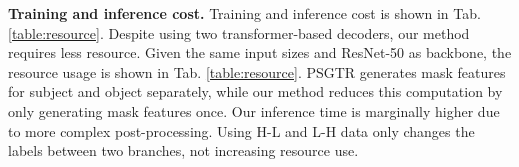 \noindent \textbf{Training and inference cost.}
Training and inference cost is shown in Tab. \ref{table:resource}.
Despite using two transformer-based decoders, our method requires less resource.
Given the same input sizes  and ResNet-50 as backbone, the resource usage is shown in Tab. \ref{table:resource}.
PSGTR \cite{yang2022panoptic} generates mask features for subject and object separately, while our method reduces this computation by only generating mask features once.
Our inference time is marginally higher due to more complex post-processing.
Using H-L and L-H data only changes the labels between two branches, not increasing resource use.
\begin{table}\small
    \centering
{}
    \vspace{+1mm}
    \caption{Training and inference cost.}
    \label{table:resource}
    \vspace{-6mm}
\end{table}
